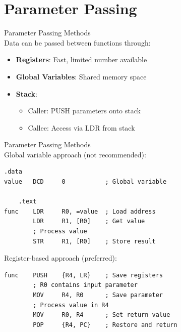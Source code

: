 \section{Parameter Passing}

\begin{concept}{Parameter Passing Methods}\\
Data can be passed between functions through:
\begin{itemize}
  \item \textbf{Registers}: Fast, limited number available
  \item \textbf{Global Variables}: Shared memory space
  \item \textbf{Stack}: 
    \begin{itemize}
      \item Caller: PUSH parameters onto stack
      \item Callee: Access via LDR from stack
    \end{itemize}
\end{itemize}
\end{concept}

\begin{example2}{Parameter Passing Methods}\\
Global variable approach (not recommended):
\begin{lstlisting}[language=armasm, style=basesmol]
    .data
value   DCD     0           ; Global variable

    .text
func    LDR     R0, =value  ; Load address
        LDR     R1, [R0]    ; Get value
        ; Process value
        STR     R1, [R0]    ; Store result
\end{lstlisting}

Register-based approach (preferred):
\begin{lstlisting}[language=armasm, style=basesmol]
func    PUSH    {R4, LR}    ; Save registers
        ; R0 contains input parameter
        MOV     R4, R0      ; Save parameter
        ; Process value in R4
        MOV     R0, R4      ; Set return value
        POP     {R4, PC}    ; Restore and return
\end{lstlisting}
\end{example2}

